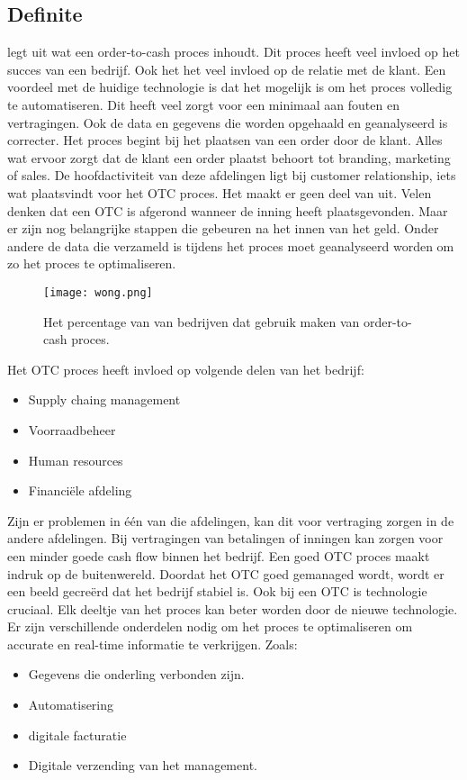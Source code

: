 \subsection{Definite}
\textcite{Wong2018} legt uit wat een order-to-cash proces inhoudt. Dit proces heeft veel invloed op het succes van een bedrijf. Ook het het veel invloed op de relatie met de klant. Een voordeel met de huidige technologie is dat het mogelijk is om het proces volledig te automatiseren. Dit heeft veel zorgt voor een minimaal aan fouten en vertragingen. Ook de data en gegevens die worden opgehaald en geanalyseerd is correcter. 
Het proces begint bij het plaatsen van een order door de klant. Alles wat ervoor zorgt dat de klant een order plaatst behoort tot branding, marketing of sales. De hoofdactiviteit van deze afdelingen ligt bij customer relationship, iets wat plaatsvindt voor het OTC proces. Het maakt er geen deel van uit. 
Velen denken dat een OTC is afgerond wanneer de inning heeft plaatsgevonden. Maar er zijn nog belangrijke stappen die gebeuren na het innen van het geld. Onder andere de data die verzameld is tijdens het proces moet geanalyseerd worden om zo het proces te optimaliseren. 
\begin{figure}[h]
	\texttt{[image: wong.png]}
	\caption{Het percentage van van bedrijven dat gebruik maken van order-to-cash proces. \textcite{Wong2018}}
	\centering
\end{figure}
Het OTC proces heeft invloed op volgende delen van het bedrijf:
\begin{itemize}
	\item Supply chaing management
	\item Voorraadbeheer
	\item Human resources
	\item Financiële afdeling
\end{itemize}
Zijn er problemen in één van die afdelingen, kan dit voor vertraging zorgen in de andere afdelingen. Bij vertragingen van betalingen of inningen kan zorgen voor een minder goede cash flow binnen het bedrijf. 
Een goed OTC proces maakt indruk op de buitenwereld. Doordat het OTC goed gemanaged wordt, wordt er een beeld gecreërd dat het bedrijf stabiel is. 
Ook bij een OTC is technologie cruciaal. Elk deeltje van het proces kan beter worden door de nieuwe technologie. Er zijn verschillende onderdelen nodig om het proces te optimaliseren om accurate en real-time informatie te verkrijgen. Zoals: 
\begin{itemize}
	\item Gegevens die onderling verbonden zijn.
	\item Automatisering
	\item digitale facturatie
	\item Digitale verzending van het management.
\end{itemize}

